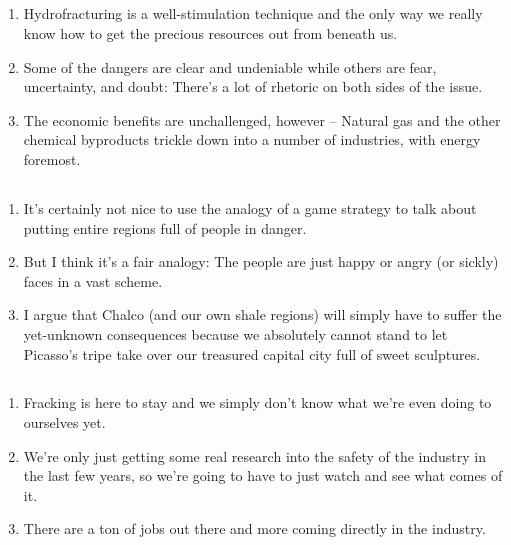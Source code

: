 \documentclass{article}
\begin{document}
  \subsection{}
    \begin{enumerate}
      \item Hydrofracturing is a well-stimulation technique and the only way we really know how to get the precious resources out from beneath us.
      \item Some of the dangers are clear and undeniable while others are fear, uncertainty, and doubt: There's a lot of rhetoric on both sides of the issue.
      \item The economic benefits are unchallenged, however -- Natural gas and the other chemical byproducts trickle down into a number of industries, with energy foremost.
    \end{enumerate}
    
  \subsection{}
    \begin{enumerate}
      \item It's certainly not nice to use the analogy of a game strategy to talk about putting entire regions full of people in danger.
      \item But I think it's a fair analogy: The people are just happy or angry (or sickly) faces in a vast scheme.
      \item I argue that Chalco (and our own shale regions) will simply have to suffer the yet-unknown consequences because we absolutely cannot stand to let Picasso's tripe take over our treasured capital city full of sweet sculptures.
    \end{enumerate}
    
  \subsection{}
    \begin{enumerate}
      \item Fracking is here to stay and we simply don't know what we're even doing to ourselves yet.
      \item We're only just getting some real research into the safety of the industry in the last few years, so we're going to have to just watch and see what comes of it.
      \item There are a ton of jobs out there and more coming directly in the industry.
    \end{enumerate}
    
\end{document}
